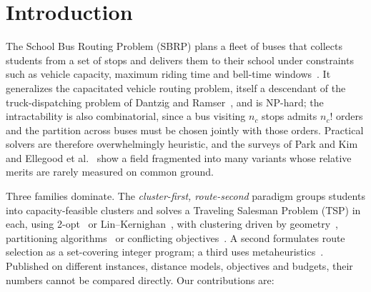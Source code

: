 \documentclass[graybox]{SNmult}
\begin{document}
\section{Introduction}
The School Bus Routing Problem (SBRP)
plans a fleet of buses that collects students from a set of stops and
delivers them to their school under constraints such as vehicle capacity,
maximum riding time and bell-time windows~\cite{Park2010TheReview}. It
generalizes the capacitated vehicle routing problem, itself a descendant
of the truck-dispatching problem of Dantzig and
Ramser~\cite{DantzigRamser1959Truck}, and is NP-hard; the intractability
is also combinatorial, since a bus visiting $n_c$ stops admits $n_c!$
orders and the partition across buses must be chosen jointly with those
orders. Practical solvers are therefore overwhelmingly heuristic, and the
surveys of Park and Kim~\cite{Park2010TheReview} and Ellegood et
al.~\cite{Ellegood2020SchoolDirections} show a field fragmented into many
variants whose relative merits are rarely measured on common ground.

Three families dominate. The \emph{cluster-first, route-second}
paradigm groups students into capacity-feasible clusters and solves a
Traveling Salesman Problem (TSP) in each, using
2-opt~\cite{Croes1958TwoOpt} or Lin--Kernighan~\cite{HelsgaunAnHeuristic},
with clustering driven by geometry~\cite{CakirRevisitingProblem},
partitioning algorithms~\cite{Comert2018AStudy} or conflicting
objectives~\cite{Corberan2002HeuristicObjectives}. A second formulates
route selection as a set-covering integer program; a
third uses metaheuristics~\cite{Baranwal2016DAVRPTW,Hatamlou2018BlackHole}.
Published on different instances, distance models, objectives and budgets,
their numbers cannot be compared directly. Our contributions are:
\end{document}
